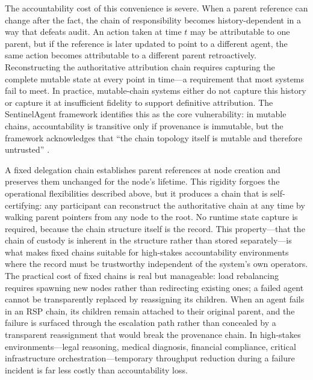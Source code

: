 \documentclass[11pt,oneside]{article}
\begin{document}
The accountability cost of this convenience is severe. When a parent reference can change after the fact, the chain of responsibility becomes history-dependent in a way that defeats audit. An action taken at time $t$ may be attributable to one parent, but if the reference is later updated to point to a different agent, the same action becomes attributable to a different parent retroactively. Reconstructing the authoritative attribution chain requires capturing the complete mutable state at every point in time---a requirement that most systems fail to meet. In practice, mutable-chain systems either do not capture this history or capture it at insufficient fidelity to support definitive attribution. The SentinelAgent framework identifies this as the core vulnerability: in mutable chains, accountability is transitive only if provenance is immutable, but the framework acknowledges that ``the chain topology itself is mutable and therefore untrusted'' \cite{sentinelagent2025arxiv}.

A fixed delegation chain establishes parent references at node creation and preserves them unchanged for the node's lifetime. This rigidity forgoes the operational flexibilities described above, but it produces a chain that is self-certifying: any participant can reconstruct the authoritative chain at any time by walking parent pointers from any node to the root. No runtime state capture is required, because the chain structure itself is the record. This property---that the chain of custody is inherent in the structure rather than stored separately---is what makes fixed chains suitable for high-stakes accountability environments where the record must be trustworthy independent of the system's own operators. The practical cost of fixed chains is real but manageable: load rebalancing requires spawning new nodes rather than redirecting existing ones; a failed agent cannot be transparently replaced by reassigning its children. When an agent fails in an RSP chain, its children remain attached to their original parent, and the failure is surfaced through the escalation path rather than concealed by a transparent reassignment that would break the provenance chain. In high-stakes environments---legal reasoning, medical diagnosis, financial compliance, critical infrastructure orchestration---temporary throughput reduction during a failure incident is far less costly than accountability loss.
\end{document}
